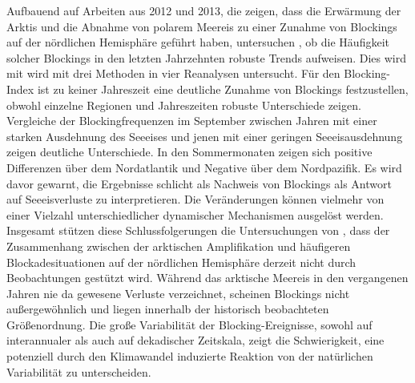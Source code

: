 Aufbauend auf Arbeiten aus 2012 und 2013, die zeigen, dass die Erwärmung der Arktis und die Abnahme von polarem Meereis zu einer Zunahme von Blockings auf der nördlichen Hemisphäre geführt haben, untersuchen \citet{barnes-2014}, ob die Häufigkeit solcher Blockings in den letzten Jahrzehnten robuste Trends aufweisen. Dies wird mit wird mit drei Methoden in vier Reanalysen untersucht. Für den Blocking-Index ist zu keiner Jahreszeit eine deutliche Zunahme von Blockings festzustellen, obwohl einzelne Regionen und Jahreszeiten robuste Unterschiede zeigen. Vergleiche der Blockingfrequenzen im September zwischen Jahren mit einer starken Ausdehnung des Seeeises und jenen mit einer geringen Seeeisausdehnung zeigen deutliche Unterschiede. In den Sommermonaten zeigen sich positive Differenzen über dem Nordatlantik und Negative über dem Nordpazifik. Es wird davor gewarnt, die Ergebnisse schlicht als Nachweis von Blockings als Antwort auf Seeeisverluste zu interpretieren. Die Veränderungen können vielmehr von einer Vielzahl unterschiedlicher dynamischer Mechanismen ausgelöst werden. Insgesamt stützen diese Schlussfolgerungen die Untersuchungen von \citet{barnes-2013-a}, dass der Zusammenhang zwischen der arktischen Amplifikation und häufigeren Blockadesituationen auf der nördlichen Hemisphäre derzeit nicht durch Beobachtungen gestützt wird. Während das arktische Meereis in den vergangenen Jahren nie da gewesene Verluste verzeichnet, scheinen Blockings nicht außergewöhnlich und liegen innerhalb der historisch beobachteten Größenordnung. Die große Variabilität der Blocking-Ereignisse, sowohl auf interannualer als auch auf dekadischer Zeitskala, zeigt die Schwierigkeit, eine potenziell durch den Klimawandel induzierte Reaktion von der natürlichen Variabilität zu unterscheiden.

